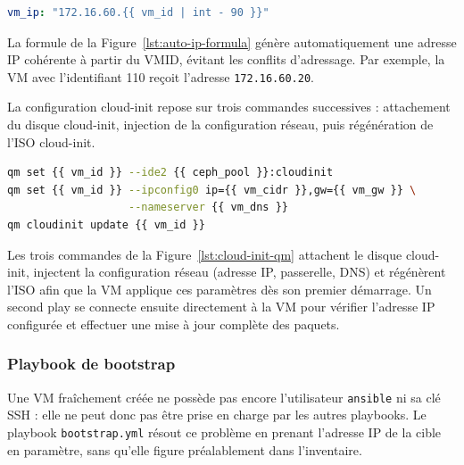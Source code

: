 \begin{lstlisting}[style=sonacode,language=yaml,caption={Formule d'attribution automatique de l'adresse
IP},label={lst:auto-ip-formula}]
vm_ip: "172.16.60.{{ vm_id | int - 90 }}"
\end{lstlisting}

\par La formule de la Figure~\ref{lst:auto-ip-formula} génère automatiquement une adresse IP cohérente à partir du VMID, évitant les conflits d'adressage. Par exemple,
la VM avec l'identifiant 110 reçoit l'adresse \texttt{172.16.60.20}.\\

\par La configuration cloud-init repose sur trois commandes successives : attachement du disque cloud-init, injection de la
configuration réseau, puis régénération de l'ISO cloud-init.\\

\begin{lstlisting}[style=sonacode,language=bash,caption={Configuration cloud-init d'une VM Proxmox},label={lst:cloud-init-qm}]
qm set {{ vm_id }} --ide2 {{ ceph_pool }}:cloudinit
qm set {{ vm_id }} --ipconfig0 ip={{ vm_cidr }},gw={{ vm_gw }} \
                   --nameserver {{ vm_dns }}
qm cloudinit update {{ vm_id }}
\end{lstlisting}

\par Les trois commandes de la Figure~\ref{lst:cloud-init-qm} attachent le disque cloud-init, injectent la configuration réseau (adresse IP, passerelle, DNS) et
régénèrent l'ISO afin que la VM applique ces paramètres dès son premier démarrage. Un second play se connecte ensuite directement à
la VM pour vérifier l'adresse IP configurée et effectuer une mise à jour complète des paquets.\\

\subsubsection{Playbook de bootstrap}

\par Une VM fraîchement créée ne possède pas encore l'utilisateur \texttt{ansible} ni sa clé SSH : elle ne peut donc pas être prise
en charge par les autres playbooks. Le playbook \texttt{bootstrap.yml} résout ce problème en prenant l'adresse IP de la cible en
paramètre, sans qu'elle figure préalablement dans l'inventaire.\\


